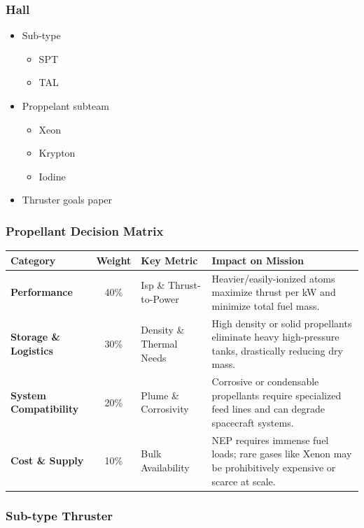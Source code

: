 \subsubsection{Hall}
\begin{itemize}
  \item Sub-type
  \begin{itemize}
    \item SPT
    \item TAL
  \end{itemize}
  \item Proppelant subteam
  \begin{itemize}
    \item Xeon
    \item Krypton
    \item Iodine
  \end{itemize}
  \item Thruster goals paper
\end{itemize}

\subsubsection{Propellant Decision Matrix}

\vspace{1.5em}

\noindent
\begin{tabularx}{\textwidth}{@{} l c l X @{}}
\toprule
\textbf{Category} & \textbf{Weight} & \textbf{Key Metric} & \textbf{Impact on Mission} \\
\midrule
\textbf{Performance} & 40\% & Isp \& Thrust-to-Power & Heavier/easily-ionized atoms maximize thrust per kW and minimize total fuel mass. \\
\addlinespace
\textbf{Storage \& Logistics} & 30\% & Density \& Thermal Needs & High density or solid propellants eliminate heavy high-pressure tanks, drastically reducing dry mass. \\
\addlinespace
\textbf{System Compatibility} & 20\% & Plume \& Corrosivity & Corrosive or condensable propellants require specialized feed lines and can degrade spacecraft systems. \\
\addlinespace
\textbf{Cost \& Supply} & 10\% & Bulk Availability & NEP requires immense fuel loads; rare gases like Xenon may be prohibitively expensive or scarce at scale. \\
\bottomrule
\end{tabularx}

\subsubsection{Sub-type Thruster}

